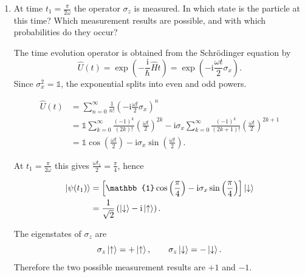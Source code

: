 \documentclass[11pt,a4paper]{scrartcl}
\newcommand{\ii}{\mathrm{i}}
\newcommand{\op}[1]{\hat{#1}}
\begin{document}
    \begin{enumerate}[label=(\alph*)]
        \item At time $t_1=\frac{\pi}{2\omega}$ the operator $\sigma_z$ is measured. In which state is the particle at this time? Which measurement results are possible, and with which probabilities do they occur?

        \begin{calculationbox}
            The time evolution operator is obtained from the Schrödinger equation by
            \[
                \op{U}(t) = \exp\left(-\frac{\ii}{\hbar}\op{H}t\right)
                = \exp\left(-\ii\frac{\omega t}{2}\sigma_x\right).
            \]
            Since $\sigma_x^2=\mathbb{1}$, the exponential splits into even and odd powers.

            \begin{calculationbox}
                \begin{align*}
                    \op{U}(t)
                    &= \sum_{n=0}^{\infty}\frac{1}{n!}\left(-\ii\frac{\omega t}{2}\sigma_x\right)^n \\
                    &= \mathbb{1}\sum_{k=0}^{\infty}\frac{(-1)^k}{(2k)!}\left(\frac{\omega t}{2}\right)^{2k}
                    -\ii\sigma_x\sum_{k=0}^{\infty}\frac{(-1)^k}{(2k+1)!}\left(\frac{\omega t}{2}\right)^{2k+1} \\
                    &= \mathbb{1}\cos\left(\frac{\omega t}{2}\right)
                    -\ii\sigma_x\sin\left(\frac{\omega t}{2}\right).
                \end{align*}
            \end{calculationbox}

            At $t_1=\frac{\pi}{2\omega}$ this gives $\frac{\omega t_1}{2}=\frac{\pi}{4}$, hence
            \begin{calculationbox}
                \begin{align*}
                    \ket{\psi(t_1)}
                    &= \left[\mathbb{1}\cos\left(\frac{\pi}{4}\right)-\ii\sigma_x\sin\left(\frac{\pi}{4}\right)\right]\ket{\downarrow} \\
                    &= \frac{1}{\sqrt{2}}\left(\ket{\downarrow}-\ii\ket{\uparrow}\right).
                \end{align*}
            \end{calculationbox}

            The eigenstates of $\sigma_z$ are
            \[
                \sigma_z\ket{\uparrow}=+\ket{\uparrow},
                \qquad
                \sigma_z\ket{\downarrow}=-\ket{\downarrow}.
            \]
            Therefore the two possible measurement results are $+1$ and $-1$.


\end{calculationbox}
\end{enumerate}
\end{document}
